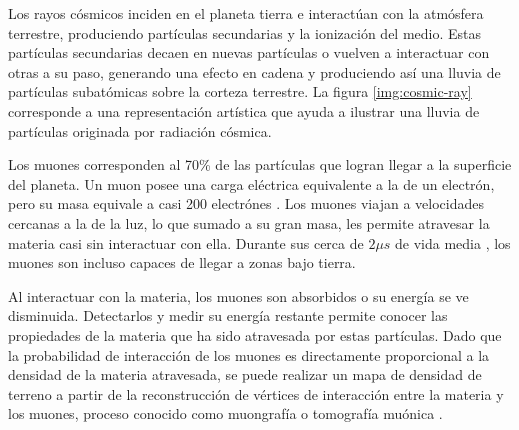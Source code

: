 	
	Los rayos cósmicos inciden en el planeta tierra e interactúan con la atmósfera terrestre, produciendo partículas secundarias y la ionización del medio. Estas partículas secundarias decaen en nuevas partículas o vuelven a interactuar con otras a su paso, generando una efecto en cadena y produciendo así una lluvia de partículas subatómicas sobre la corteza terrestre. La figura \ref{img:cosmic-ray} corresponde a una representación artística que ayuda a ilustrar una lluvia de partículas originada por radiación cósmica.
	
	Los muones corresponden al 70\% de las partículas que logran llegar a la superficie del planeta. Un muon posee una carga eléctrica equivalente a la de un electrón, pero su masa equivale a casi 200 electrónes . Los muones viajan a velocidades cercanas a la de la luz, lo que sumado a su gran masa, les permite atravesar la materia casi sin interactuar con ella. Durante sus cerca de $2\mu s$ de vida media , los muones son incluso capaces de llegar a zonas bajo tierra.
	
	Al interactuar con la materia, los muones son absorbidos o su energía se ve disminuida. Detectarlos y medir su energía restante permite conocer las propiedades de la materia que ha sido atravesada por estas partículas. Dado que la probabilidad de interacción  de los muones es directamente proporcional a la densidad de la materia atravesada, se puede realizar un mapa de densidad de terreno a partir de la reconstrucción de vértices de interacción entre la materia y los muones, proceso conocido como muongrafía o tomografía muónica .  
	

